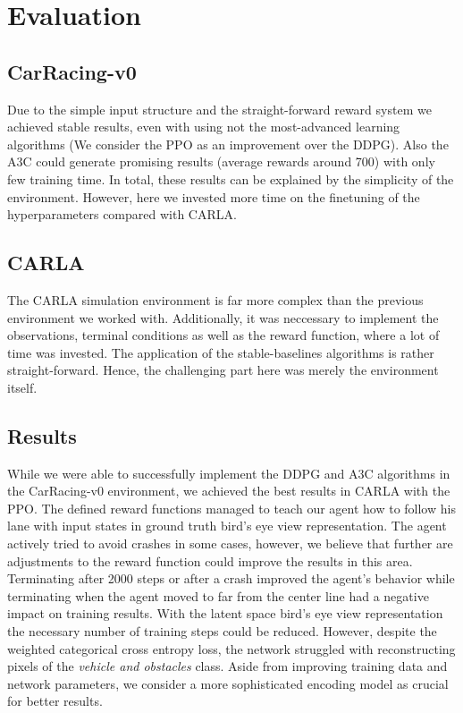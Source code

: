 \documentclass[letterpaper, 10 pt, conference]{ieeeconf}  %
\begin{document}

\section{Evaluation}
\subsection{CarRacing-v0}
Due to the simple input structure and the straight-forward reward system we achieved stable results, even with using not the most-advanced learning algorithms (We consider the PPO as an improvement over the DDPG). Also the A3C could generate promising results (average rewards around 700) with only few training time.  In total, these results can be explained by the simplicity of the environment. However, here we invested more time on the finetuning of the hyperparameters compared with CARLA.
\subsection{CARLA}
The CARLA simulation environment is far more complex than the previous environment we worked with. Additionally, it was neccessary to implement the observations, terminal conditions as well as the reward function, where a lot of time was invested. The application of the stable-baselines algorithms is rather straight-forward. Hence, the challenging part here was merely the environment itself. 
\subsection{Results}
While we were able to successfully implement the DDPG and A3C algorithms in the CarRacing-v0 environment, we achieved the best results in CARLA with the PPO. The defined reward functions managed to teach our agent how to follow his lane with input states in ground truth bird's eye view representation. The agent actively tried to avoid crashes in some cases, however, we believe that further are adjustments to the reward function could improve the results in this area. Terminating after 2000 steps or after a crash improved the agent's behavior while terminating when the agent moved to far from the center line had a negative impact on training results. With the latent space bird's eye view representation the necessary number of training steps could be reduced. However, despite the weighted categorical cross entropy loss, the network struggled with reconstructing pixels of the \textit{vehicle and obstacles} class. Aside from improving training data and network parameters, we consider a more sophisticated encoding model as crucial for better results. 
\end{document}
